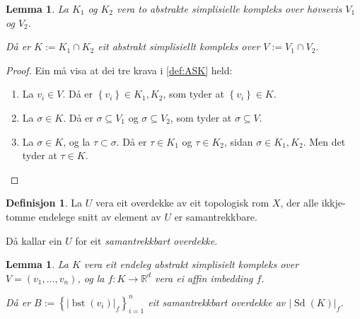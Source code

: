 \documentclass[a4paper, 12pt, norsk]{article}
\theoremstyle{plain}
\newtheorem{lemma}[theorem]{Lemma}
\theoremstyle{definition}
\newtheorem{definition}[theorem]{Definisjon}
\newcommand{\Rb}{\mathbb{R}}
\newcommand{\intersect}{ \mathop{\cap}\limits }
\newcommand{\gr}[1]{ \lvert #1 \rvert } %
\newcommand{\set}[1]{ \left\{ #1 \right\} } %
\DeclareMathOperator{\Sd}{Sd} %
\DeclareMathOperator{\bst}{bst} %
\begin{document}
\begin{lemma} \label{thm:snitt-av-ASK-er-ASK}
	La \( K_1 \) og \( K_2 \) vera to abstrakte simplisielle kompleks over høvsevis \( V_1 \) og \( V_2 \). 
	
	Då er \( K := K_1 \intersect K_2 \) eit abstrakt simplisiellt kompleks over \( V := V_1 \intersect V_2 \).
\end{lemma}

\begin{proof}
	Ein må visa at dei tre krava i \autoref{def:ASK} held:
	\begin{enumerate}
		\item La \( v_i \in V \). Då er \( \set{v_i} \in K_1, K_2 \), som tyder at \( \set{v_i} \in K \).
  		\item La \( \sigma \in K \). Då er \( \sigma \subseteq V_1 \) og \( \sigma \subseteq V_2 \), som tyder at \( \sigma \subseteq V \).
    	\item La \( \sigma \in K \), og la \( \tau \subset \sigma \). Då er \( \tau \in K_1 \) og \( \tau \in K_2 \), sidan \( \sigma \in K_1, K_2 \). Men det tyder at \( \tau \in K \).
	\end{enumerate}
\end{proof}

\begin{definition}
	La \( U \) vera eit overdekke av eit topologisk rom \( X \), der alle ikkje-tomme endelege snitt av element av \( U \) er samantrekkbare. 
	
	Då kallar ein \( U \) for eit \emph{samantrekkbart overdekke}.
\end{definition}

\begin{lemma} \label{thm:bst-good}
	La \( K \) vera eit endeleg abstrakt simplisielt kompleks over \( V = (v_1, \dots, v_n) \), og la \( f: K \to \Rb^d \) vera ei affin imbedding \( f \). 
	
	Då er \( B := \set{\gr{\bst(v_i)}_f}_{i=1}^{n} \) eit samantrekkbart overdekke av \( \gr{\Sd(K)}_f \).
\end{lemma}
\end{document}
